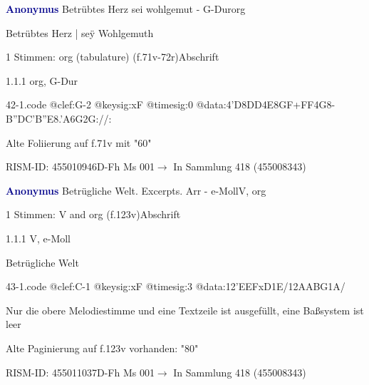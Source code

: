 \documentclass[twocolumn]{book}
\begin{document}
\par \vspace{7pt} \textcolor{darkblue}{\textbf{Anonymus  }}\hfillplus{\textbf{[42]}}\newline Betrübtes Herz sei wohlgemut - G-Dur\newline org
\par \begin{itshape}[f.71v, at left:] Betrübtes Herz | seÿ Wohlgemuth\end{itshape} 
\par \textcolor{darkblue}{}  1 Stimmen: org (tabulature)  (f.71v-72r)\newline Abschrift
\par 1.1.1  org, G-Dur  
\begin{filecontents*}{42-1.code}
@clef:G-2
@keysig:xF
@timesig:0
@data:4'D{8DD}4E{8GF+}{FF}4G8-{B''DC}{'B''E8.'A6G}2G://:
\end{filecontents*}
\newline
%
\par Alte Foliierung auf f.71v mit "60"
\par RISM-ID: 455010946\newline D-Fh  Ms 001\newline $\rightarrow$ In Sammlung 418 (455008343)
      
\par \vspace{7pt} \textcolor{darkblue}{\textbf{Anonymus  }}\hfillplus{\textbf{[43]}}\newline Betrügliche Welt. Excerpts. Arr - e-Moll\newline V, org
\par \begin{itshape}\end{itshape} 
\par \textcolor{darkblue}{}  1 Stimmen: V and org  (f.123v)\newline Abschrift
\par 1.1.1  V, e-Moll\newline \begin{footnotesize} Betrügliche Welt \end{footnotesize}  
\begin{filecontents*}{43-1.code}
@clef:C-1
@keysig:xF
@timesig:3
@data:12'EEFxD1E/12AABG1A/
\end{filecontents*}
\newline
%
\par Nur die obere Melodiestimme und eine Textzeile ist ausgefüllt, eine Baßsystem ist leer
\par Alte Paginierung auf f.123v vorhanden: "80"
\par RISM-ID: 455011037\newline D-Fh  Ms 001\newline $\rightarrow$ In Sammlung 418 (455008343)
      
\end{document}
